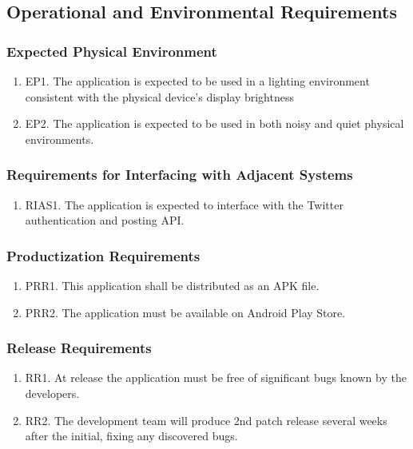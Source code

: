 \documentclass[]{article}
\begin{document}
\subsection{Operational and Environmental Requirements}
\subsubsection{Expected Physical Environment}
\begin{enumerate}
	\item EP1. The application is expected to be used in a lighting environment consistent with the physical device's display brightness
	\item EP2. The application is expected to be used in both noisy and quiet physical environments.
\end{enumerate}

\subsubsection{Requirements for Interfacing with Adjacent Systems}
\begin{enumerate}
	\item RIAS1. The application is expected to interface with the Twitter authentication and posting API.
\end{enumerate}

\subsubsection{Productization Requirements}
\begin{enumerate}
	\item PRR1. This application shall be distributed as an APK file.
	\item PRR2. The application must be available on Android Play Store.
\end{enumerate}

\subsubsection{Release Requirements}
\begin{enumerate}
	\item RR1. At release the application must be free of significant bugs known by the developers.
	\item RR2. The development team will produce 2nd patch release several weeks after the initial, fixing any discovered bugs.
\end{enumerate}
\end{document}
